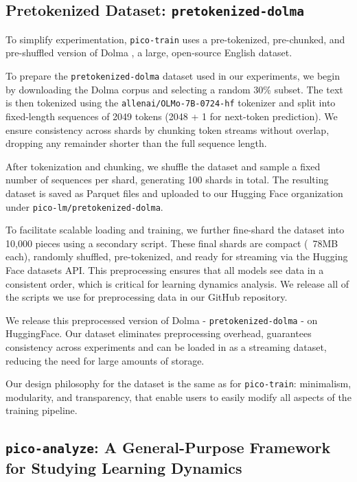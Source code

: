 \subsection{Pretokenized Dataset: \texttt{pretokenized-dolma}}

To simplify experimentation, \texttt{pico-train} uses a pre-tokenized, pre-chunked, and pre-shuffled version of Dolma \citep{soldaini2024dolma}, a large, open-source English dataset. 

To prepare the \texttt{pretokenized-dolma} dataset used in our experiments, we begin by downloading the Dolma corpus and selecting a random 30\% subset. The text is then tokenized using the \verb|allenai/OLMo-7B-0724-hf| tokenizer and split into fixed-length sequences of 2049 tokens (2048 + 1 for next-token prediction). We ensure consistency across shards by chunking token streams without overlap, dropping any remainder shorter than the full sequence length.

After tokenization and chunking, we shuffle the dataset and sample a fixed number of sequences per shard, generating 100 shards in total. The resulting dataset is saved as Parquet files and uploaded to our Hugging Face organization under \verb|pico-lm/pretokenized-dolma|.

To facilitate scalable loading and training, we further fine-shard the dataset into 10,000 pieces using a secondary script. These final shards are compact (~78MB each), randomly shuffled, pre-tokenized, and ready for streaming via the Hugging Face datasets API. This preprocessing ensures that all models see data in a consistent order, which is critical for learning dynamics analysis. We release all of the scripts we use for preprocessing data in our GitHub repository.

We release this preprocessed version of Dolma - \texttt{pretokenized-dolma} - on HuggingFace. Our dataset eliminates preprocessing overhead, guarantees consistency across experiments and can be loaded in as a streaming dataset, reducing the need for large amounts of storage.

Our design philosophy for the dataset is the same as for \texttt{pico-train}: minimalism, modularity, and transparency, that enable users to easily modify all aspects of the training pipeline. 

\subsection{\texttt{pico-analyze}: A General-Purpose Framework for Studying Learning Dynamics}

